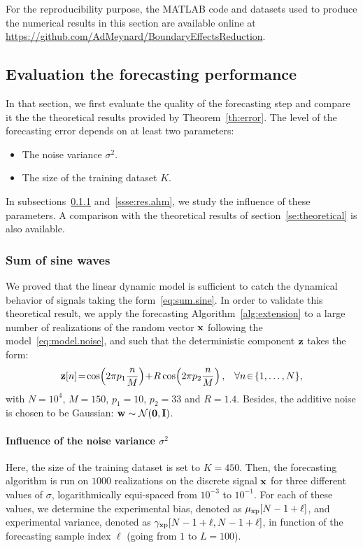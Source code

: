 For the reproducibility purpose, the MATLAB code and datasets used to produce the numerical results in this section are available online at \url{https://github.com/AdMeynard/BoundaryEffectsReduction}.

\subsection{Evaluation the forecasting performance}
In that section, we first evaluate the quality of the forecasting step and compare it the the theoretical results provided by Theorem~\ref{th:error}. The level of the forecasting error depends on at least two parameters:
\begin{itemize}
\item The noise variance $\sigma^2$.
\item The size of the training dataset $K$. 
\end{itemize}
In subsections~\ref{ssse:res.sine} and~\ref{ssse:res.ahm}, we study the influence of these parameters. A comparison with the theoretical results of section~\ref{se:theoretical} is also available.

\subsubsection{Sum of sine waves}
\label{ssse:res.sine}
We proved that the linear dynamic model is sufficient to catch the dynamical behavior of signals taking the form~\eqref{eq:sum.sine}. In order to validate this theoretical result, we apply the forecasting Algorithm~\ref{alg:extension} to a large number of realizations of the random vector ${\mathbf x}$ following the model~\eqref{eq:model.noise}, and such that the deterministic component ${\mathbf z}$ takes the form:
\[
\bz[n]\! =\!\cos\!\left(2\pi p_1 \dfrac{n}{M} \right)\! +\! R\cos\!\left(2\pi p_2 \dfrac{n}{M} \right),\quad \!\forall n\!\in\!\{1,\ldots,N\},
\]
with $N=10^4$, $M=150$, $p_1=10$, $p_2=33$ and $R=1.4$. Besides, the additive noise is chosen to be Gaussian: ${\mathbf w}\sim{\mathcal N}(\boldsymbol{0},{\mathbf I})$.

\paragraph{Influence of the noise variance $\sigma^2$} Here, the size of the training dataset is set to $K=450$. Then, the forecasting algorithm is run on $1000$ realizations on the discrete signal ${\mathbf x}$ for three different values of $\sigma$, logarithmically equi-spaced from $10^{-3}$ to $10^{-1}$. For each of these values, we determine the experimental bias, denoted as $\mu_{{\mathrm{xp}}}[N-1+\ell]$, and experimental variance, denoted as $\gamma_{{\mathrm{xp}}}[N-1+\ell,N-1+\ell]$, in function of the forecasting sample index $\ell$ (going from $1$ to $L=100$).

